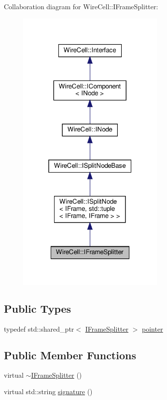 Collaboration diagram for Wire\+Cell\+:\+:I\+Frame\+Splitter\+:
\nopagebreak
\begin{figure}[H]
\begin{center}
\leavevmode
\includegraphics[width=208pt]{class_wire_cell_1_1_i_frame_splitter__coll__graph}
\end{center}
\end{figure}
\subsection*{Public Types}
\begin{DoxyCompactItemize}
\item 
typedef std\+::shared\+\_\+ptr$<$ \hyperlink{class_wire_cell_1_1_i_frame_splitter}{I\+Frame\+Splitter} $>$ \hyperlink{class_wire_cell_1_1_i_frame_splitter_ace5eb19c84084eb3ef737efc976edf54}{pointer}
\end{DoxyCompactItemize}
\subsection*{Public Member Functions}
\begin{DoxyCompactItemize}
\item 
virtual \hyperlink{class_wire_cell_1_1_i_frame_splitter_a04d06643c5f6d96b49d94fa0315c3ea9}{$\sim$\+I\+Frame\+Splitter} ()
\item 
virtual std\+::string \hyperlink{class_wire_cell_1_1_i_frame_splitter_aab4f057f5241c5c8f6b688450741daec}{signature} ()
\end{DoxyCompactItemize}


